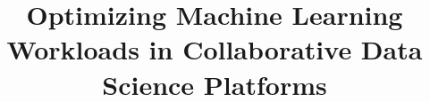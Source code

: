 \documentclass{vldb}
\begin{document}

\title{Optimizing Machine Learning Workloads in Collaborative Data Science Platforms}

%
%
%
%
%


\maketitle














\end{document}
